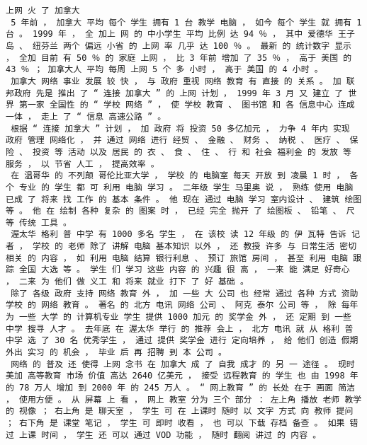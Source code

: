\documentclass{article}
\begin{document}
\begin{Verbatim}[commandchars=\\\{\}]
 上网 火 了 加拿大 
 5 年前 ， 加拿大 平均 每个 学生 拥有 1 台 教学 电脑 ， 如今 每个 学生 就 拥有 1 台 。 1999 年 ， 全 加上 网 的 中小学生 平均 比例 达 94 ％ ， 其中 爱德华 王子 岛 、 纽芬兰 两个 偏远 小省 的 上网 率 几乎 达 100 ％ 。 最新 的 统计数字 显示 ， 全加 目前 有 50 ％ 的 家庭 上网 ， 比 3 年前 增加 了 35 ％ ， 高于 美国 的 43 ％ ； 加拿大人 平均 每周 上网 5 个 多 小时 ， 高于 美国 的 4 小时 。 
 加拿大 网络 事业 发展 较 快 ， 与 政府 重视 网络 教育 有 直接 的 关系 。 加 联邦政府 先是 推出 了 “ 连接 加拿大 ” 的 上网 计划 ， 1999 年 3 月 又 建立 了 世界 第一家 全国性 的 “ 学校 网络 ” ， 使 学校 教育 、 图书馆 和 各 信息中心 连成 一体 ， 走上 了 “ 信息 高速公路 ” 。 
 根据 “ 连接 加拿大 ” 计划 ， 加 政府 将 投资 50 多亿加元 ， 力争 4 年内 实现 政府 管理 网络化 ， 并 通过 网络 进行 经贸 、 金融 、 财务 、 纳税 、 医疗 、 保险 、 投资 等 活动 以及 居民 的 衣 、 食 、 住 、 行 和 社会 福利金 的 发放 等 服务 ， 以 节省 人工 ， 提高效率 。 
 在 温哥华 的 不列颠 哥伦比亚大学 ， 学校 的 电脑室 每天 开放 到 凌晨 1 时 ， 各个 专业 的 学生 都 可 利用 电脑 学习 。 二年级 学生 马里奥 说 ， 熟练 使用 电脑 已成 了 将来 找 工作 的 基本 条件 。 他 现在 通过 电脑 学习 室内设计 、 建筑 绘图 等 。 他 在 绘制 各种 复杂 的 图案 时 ， 已经 完全 抛开 了 绘图板 、 铅笔 、 尺 等 传统 工具 。 
 渥太华 格利 普 中学 有 1000 多名 学生 ， 在 该校 读 12 年级 的 伊 瓦特 告诉 记者 ， 学校 的 老师 除了 讲解 电脑 基本知识 以外 ， 还 教授 许多 与 日常生活 密切相关 的 内容 ， 如 利用 电脑 结算 银行利息 、 预订 旅馆 房间 ， 甚至 利用 电脑 跟踪 全国 大选 等 。 学生 们 学习 这些 内容 的 兴趣 很 高 ， 一来 能 满足 好奇心 ， 二来 为 他们 做 义工 和 将来 就业 打下 了 好 基础 。 
 除了 各级 政府 支持 网络 教育 外 ， 加 一些 大 公司 也 经常 通过 各种 方式 资助 学校 的 网络 教育 。 著名 的 北方 电讯 网络 公司 、 阿克 泰尔 公司 等 ， 除 每年 为 一些 大学 的 计算机专业 学生 提供 1000 加元 的 奖学金 外 ， 还 定期 到 一些 中学 搜寻 人才 。 去年底 在 渥太华 举行 的 推荐 会上 ， 北方 电讯 就 从 格利 普 中学 选 了 30 名 优秀学生 ， 通过 提供 奖学金 进行 定向培养 ， 给 他们 创造 假期 外出 实习 的 机会 ， 毕业 后 再 招聘 到 本 公司 。 
 网络 的 普及 还 使得 上网 念书 在 加拿大 成 了 自我 成才 的 另 一 途径 。 现时 美加 高等教育 市场 价值 高达 2640 亿美元 ， 接受 远程教育 的 学生 也 由 1998 年 的 78 万人 增加 到 2000 年 的 245 万人 。 “ 网上教育 ” 的 长处 在于 画面 简洁 ， 使用方便 。 从 屏幕 上 看 ， 网上 教室 分为 三个 部分 ： 左上角 播放 老师 教学 的 视像 ； 右上角 是 聊天室 ， 学生 可 在 上课时 随时 以 文字 方式 向 教师 提问 ； 右下角 是 课堂 笔记 ， 学生 可 即时 收看 ， 也 可以 下载 存档 备查 。 如果 错过 上课 时间 ， 学生 还 可以 通过 VOD 功能 ， 随时 翻阅 讲过 的 内容 。 

\end{Verbatim}
\end{document}
